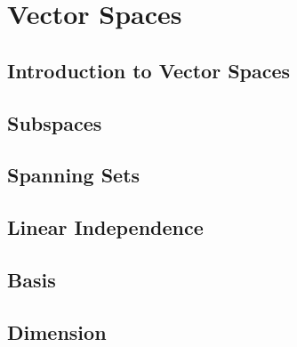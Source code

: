 \chapter{Vector Spaces}
\section{Introduction to Vector Spaces}

\newpage
\section{Subspaces}

\newpage
\section{Spanning Sets}

\newpage
\section{Linear Independence}

\newpage
\section{Basis}

\newpage
\section{Dimension}

